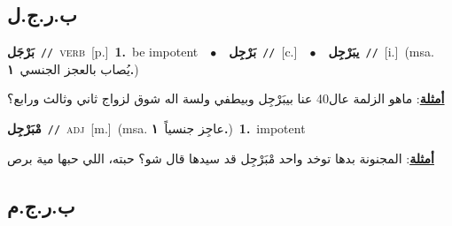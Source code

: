 \documentclass[10pt,a4paper,twoside]{article} %
\begin{document}
\begin{multicols}{2}
\vspace{-3mm}
\subsection*{\color{blue}\foreignlanguage{arabic}{ب.ر.ج.ل}\color{blue}{}} 

{\setlength\topsep{0pt}\textbf{\foreignlanguage{arabic}{بَرْجَل}}\ {\color{gray}\texttt{//}\color{black}}\ \textsc{verb}\ [p.]\ \textbf{1.}~be impotent\ \ $\bullet$\ \ \setlength\topsep{0pt}\textbf{\foreignlanguage{arabic}{بَرْجِل}}\ {\color{gray}\texttt{//}\color{black}}\ [c.]\ \ $\bullet$\ \ \setlength\topsep{0pt}\textbf{\foreignlanguage{arabic}{يبَرْجِل}}\ {\color{gray}\texttt{//}\color{black}}\ [i.]\ \color{gray}(msa. \foreignlanguage{arabic}{يُصاب بالعجز الجنسي}~\foreignlanguage{arabic}{\textbf{١.}})\color{black}\  \begin{flushright}\color{gray}\foreignlanguage{arabic}{\textbf{\underline{\foreignlanguage{arabic}{أمثلة}}}: ماهو الزلمة عال40 عنا بيبَرْجِل وبيطفي ولسة اله شوق لزواج ثاني وثالث ورابع؟}\end{flushright}\color{black}} \vspace{2mm}

{\setlength\topsep{0pt}\textbf{\foreignlanguage{arabic}{مْبَرْجِل}}\ {\color{gray}\texttt{//}\color{black}}\ \textsc{adj}\ [m.]\ \color{gray}(msa. \foreignlanguage{arabic}{عاجِز جنسياً}~\foreignlanguage{arabic}{\textbf{١.}})\color{black}\ \textbf{1.}~impotent\  \begin{flushright}\color{gray}\foreignlanguage{arabic}{\textbf{\underline{\foreignlanguage{arabic}{أمثلة}}}: المجنونة بدها توخد واحد مْبَرْجِل قد سيدها قال شو؟ حبته، اللي حبها مية برص}\end{flushright}\color{black}} \vspace{2mm}

\vspace{-3mm}
\subsection*{\color{blue}\foreignlanguage{arabic}{ب.ر.ج.م}\color{blue}{}} 


\end{multicols}
\end{document}
